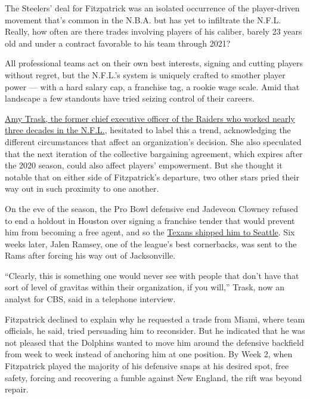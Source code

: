 The Steelers' deal for Fitzpatrick was an isolated occurrence of the
player-driven movement that's common in the N.B.A. but has yet to
infiltrate the N.F.L. Really, how often are there trades involving
players of his caliber, barely 23 years old and under a contract
favorable to his team through 2021?

All professional teams act on their own best interests, signing and
cutting players without regret, but the N.F.L.'s system is uniquely
crafted to smother player power --- with a hard salary cap, a franchise
tag, a rookie wage scale. Amid that landscape a few standouts have tried
seizing control of their careers.

\href{https://www.sbnation.com/nfl/2019/10/4/20799103/amy-trask-raiders-women-nfl-leaders-interview}{Amy
Trask, the former chief executive officer of the Raiders who worked
nearly three decades in the N.F.L.}, hesitated to label this a trend,
acknowledging the different circumstances that affect an organization's
decision. She also speculated that the next iteration of the collective
bargaining agreement, which expires after the 2020 season, could also
affect players' empowerment. But she thought it notable that on either
side of Fitzpatrick's departure, two other stars pried their way out in
such proximity to one another.

On the eve of the season, the Pro Bowl defensive end Jadeveon Clowney
refused to end a holdout in Houston over signing a franchise tender that
would prevent him from becoming a free agent, and so the
\href{https://www.nytimes3xbfgragh.onion/2019/09/01/sports/football/jadeveon-clowney-trade-seahawks.html}{Texans
shipped him to Seattle}. Six weeks later, Jalen Ramsey, one of the
league's best cornerbacks, was sent to the Rams after forcing his way
out of Jacksonville.

``Clearly, this is something one would never see with people that don't
have that sort of level of gravitas within their organization, if you
will,'' Trask, now an analyst for CBS, said in a telephone interview.

Fitzpatrick declined to explain why he requested a trade from Miami,
where team officials, he said, tried persuading him to reconsider. But
he indicated that he was not pleased that the Dolphins wanted to move
him around the defensive backfield from week to week instead of
anchoring him at one position. By Week 2, when Fitzpatrick played the
majority of his defensive snaps at his desired spot, free safety,
forcing and recovering a fumble against New England, the rift was beyond
repair.

